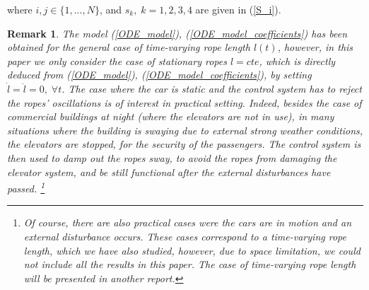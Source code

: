 \documentclass[letterpaper, 11 pt, conference]{ieeeconf}
\newtheorem{remark}{Remark}
\begin{document}
where $i,j\in\{1,...,N\}$, and $s_{k},\;k=1,2,3,4$ are given in
(\ref{S_i}).
\begin{remark}
The model (\ref{ODE_model}), (\ref{ODE_model_coefficients}) has
been obtained for the general case of time-varying rope length
$l(t)$, however, in this paper we only consider the case of
stationary ropes $l=cte$, which is directly deduced from
(\ref{ODE_model}), (\ref{ODE_model_coefficients}), by setting
$\dot{l}=\ddot{l}=0,\;\forall t$. The case where the car is static
and the control system has to reject the ropes' oscillations is of
interest in practical setting. Indeed, besides the case of
commercial buildings at night (where the elevators are not in
use), in many situations where the building is swaying due to
external strong weather conditions, the elevators are stopped, for
the security of the passengers. The control system is then used to
damp out the ropes sway, to avoid the ropes from damaging the
elevator system, and be still functional after the external
disturbances have passed. \footnote{ Of course, there are also
practical cases were the cars are in motion and an external
disturbance occurs. These cases correspond to a time-varying rope
length, which we have also studied, however, due to space
limitation, we could not include all the results in this paper.
The case of time-varying rope length will be presented in another
report.}
\end{remark}
\end{document}
